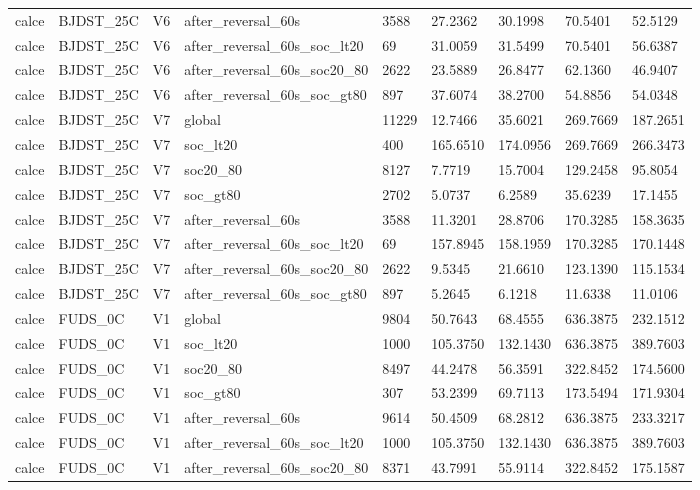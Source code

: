 \begin{tabular}{lllllllll}
calce & BJDST\_25C & V6 & after\_reversal\_60s & 3588 & 27.2362 & 30.1998 & 70.5401 & 52.5129 \\
calce & BJDST\_25C & V6 & after\_reversal\_60s\_soc\_lt20 & 69 & 31.0059 & 31.5499 & 70.5401 & 56.6387 \\
calce & BJDST\_25C & V6 & after\_reversal\_60s\_soc20\_80 & 2622 & 23.5889 & 26.8477 & 62.1360 & 46.9407 \\
calce & BJDST\_25C & V6 & after\_reversal\_60s\_soc\_gt80 & 897 & 37.6074 & 38.2700 & 54.8856 & 54.0348 \\
calce & BJDST\_25C & V7 & global & 11229 & 12.7466 & 35.6021 & 269.7669 & 187.2651 \\
calce & BJDST\_25C & V7 & soc\_lt20 & 400 & 165.6510 & 174.0956 & 269.7669 & 266.3473 \\
calce & BJDST\_25C & V7 & soc20\_80 & 8127 & 7.7719 & 15.7004 & 129.2458 & 95.8054 \\
calce & BJDST\_25C & V7 & soc\_gt80 & 2702 & 5.0737 & 6.2589 & 35.6239 & 17.1455 \\
calce & BJDST\_25C & V7 & after\_reversal\_60s & 3588 & 11.3201 & 28.8706 & 170.3285 & 158.3635 \\
calce & BJDST\_25C & V7 & after\_reversal\_60s\_soc\_lt20 & 69 & 157.8945 & 158.1959 & 170.3285 & 170.1448 \\
calce & BJDST\_25C & V7 & after\_reversal\_60s\_soc20\_80 & 2622 & 9.5345 & 21.6610 & 123.1390 & 115.1534 \\
calce & BJDST\_25C & V7 & after\_reversal\_60s\_soc\_gt80 & 897 & 5.2645 & 6.1218 & 11.6338 & 11.0106 \\
calce & FUDS\_0C & V1 & global & 9804 & 50.7643 & 68.4555 & 636.3875 & 232.1512 \\
calce & FUDS\_0C & V1 & soc\_lt20 & 1000 & 105.3750 & 132.1430 & 636.3875 & 389.7603 \\
calce & FUDS\_0C & V1 & soc20\_80 & 8497 & 44.2478 & 56.3591 & 322.8452 & 174.5600 \\
calce & FUDS\_0C & V1 & soc\_gt80 & 307 & 53.2399 & 69.7113 & 173.5494 & 171.9304 \\
calce & FUDS\_0C & V1 & after\_reversal\_60s & 9614 & 50.4509 & 68.2812 & 636.3875 & 233.3217 \\
calce & FUDS\_0C & V1 & after\_reversal\_60s\_soc\_lt20 & 1000 & 105.3750 & 132.1430 & 636.3875 & 389.7603 \\
calce & FUDS\_0C & V1 & after\_reversal\_60s\_soc20\_80 & 8371 & 43.7991 & 55.9114 & 322.8452 & 175.1587 \\

\end{tabular}
